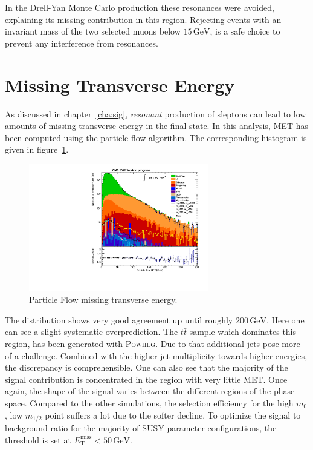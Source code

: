 In the Drell-Yan Monte Carlo production these resonances were avoided, explaining its missing contribution in this region. Rejecting events with an invariant mass of the two selected muons below $15\,\text{GeV}$, is a safe choice to prevent any interference from resonances.


\section{Missing Transverse Energy}
\label{sec:met}

As discussed in chapter~\ref{cha:sig}, \textit{resonant} production of sleptons can lead to low amounts of missing transverse energy in the final state. In this analysis, MET has been computed using the particle flow algorithm. The corresponding histogram is given in figure~\ref{fig:pfmet}.

\begin{figure}[ht!]
  \centering
    \includegraphics[width=0.7\textwidth]{plots/pfmet.pdf}
  \caption{Particle Flow missing transverse energy.}
  \label{fig:pfmet}
\end{figure}

The distribution shows very good agreement up until roughly $200\,\text{GeV}$. Here one can see a slight systematic overprediction. The $t\bar{t}$ sample which dominates this region, has been generated with \textsc{Powheg}. Due to that additional jets pose more of a challenge. Combined with the higher jet multiplicity towards higher energies, the discrepancy is comprehensible. One can also see that the majority of the signal contribution is concentrated in the region with very little MET. Once again, the shape of the signal varies between the different regions of the phase space. Compared to the other simulations, the selection efficiency for the high $m_0$, low $m_{1/2}$ point suffers a lot due to the softer decline. To optimize the signal to background ratio for the majority of SUSY parameter configurations, the threshold is set at $E^{\text{miss}}_{\text{T}} < 50\,\text{GeV}$.

